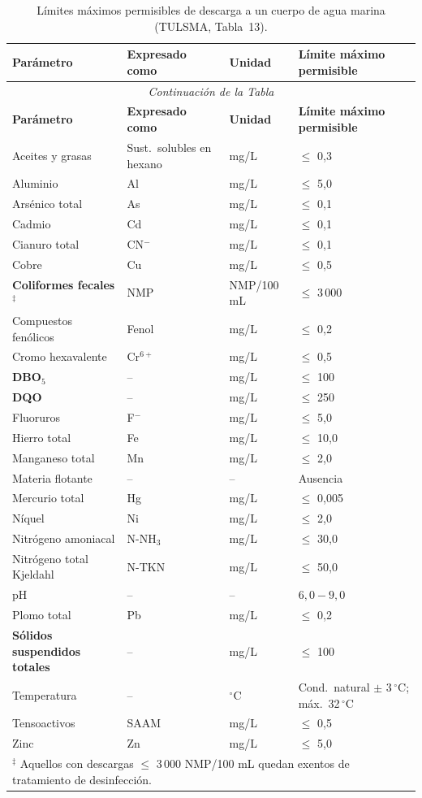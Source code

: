 \documentclass[12pt,a4paper]{article}
\begin{document}
\small
\begin{longtable}{p{4.5cm}p{2.0cm}p{2.0cm}p{3.5cm}}
\caption{L\'imites m\'aximos permisibles de descarga a un cuerpo de agua marina (TULSMA, Tabla~13).}\\
\toprule
\textbf{Par\'ametro} & \textbf{Expresado como} & \textbf{Unidad} & \textbf{L\'imite m\'aximo permisible} \\
\midrule
\endfirsthead
\multicolumn{4}{c}{\small\itshape Continuaci\'on de la Tabla}\\
\toprule
\textbf{Par\'ametro} & \textbf{Expresado como} & \textbf{Unidad} & \textbf{L\'imite m\'aximo permisible} \\
\midrule
\endhead
\bottomrule
\endlastfoot
Aceites y grasas & Sust.\ solubles en hexano & mg/L & $\leq$ 0,3 \\
Aluminio & Al & mg/L & $\leq$ 5,0 \\
Ars\'enico total & As & mg/L & $\leq$ 0,1 \\
Cadmio & Cd & mg/L & $\leq$ 0,1 \\
Cianuro total & CN$^-$ & mg/L & $\leq$ 0,1 \\
Cobre & Cu & mg/L & $\leq$ 0,5 \\
\textbf{Coliformes fecales}$^\ddagger$ & NMP & NMP/100 mL & $\leq$ 3\,000 \\
Compuestos fen\'olicos & Fenol & mg/L & $\leq$ 0,2 \\
Cromo hexavalente & Cr$^{6+}$ & mg/L & $\leq$ 0,5 \\
\textbf{DBO$_5$} & -- & mg/L & $\leq$ 100 \\
\textbf{DQO} & -- & mg/L & $\leq$ 250 \\
Fluoruros & F$^-$ & mg/L & $\leq$ 5,0 \\
Hierro total & Fe & mg/L & $\leq$ 10,0 \\
Manganeso total & Mn & mg/L & $\leq$ 2,0 \\
Materia flotante & -- & -- & Ausencia \\
Mercurio total & Hg & mg/L & $\leq$ 0,005 \\
N\'iquel & Ni & mg/L & $\leq$ 2,0 \\
Nitr\'ogeno amoniacal & N-NH$_3$ & mg/L & $\leq$ 30,0 \\
Nitr\'ogeno total Kjeldahl & N-TKN & mg/L & $\leq$ 50,0 \\
pH & -- & -- & $6,0 - 9,0$ \\
Plomo total & Pb & mg/L & $\leq$ 0,2 \\
\textbf{S\'olidos suspendidos totales} & -- & mg/L & $\leq$ 100 \\
Temperatura & -- & $^\circ$C & Cond.\ natural $\pm$ 3\,$^\circ$C; m\'ax.\ 32\,$^\circ$C \\
Tensoactivos & SAAM & mg/L & $\leq$ 0,5 \\
Zinc & Zn & mg/L & $\leq$ 5,0 \\
\multicolumn{4}{l}{\footnotesize $^\ddagger$ Aquellos con descargas $\leq$ 3\,000 NMP/100 mL quedan exentos de tratamiento de desinfecci\'on.}\\
\end{longtable}
\end{document}
